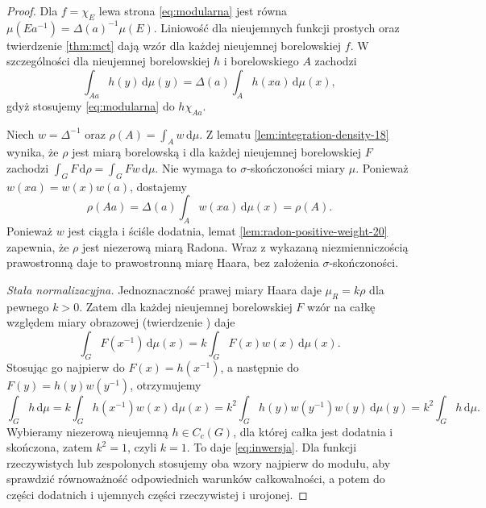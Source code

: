 \begin{proof}
Dla $f=\chi_E$ lewa strona \eqref{eq:modularna}
jest równa $\mu(Ea^{-1})=\Delta(a)^{-1}\mu(E)$.
Liniowość dla nieujemnych funkcji prostych oraz
twierdzenie \ref{thm:mct} dają wzór dla każdej
nieujemnej borelowskiej $f$.
W szczególności dla nieujemnej borelowskiej $h$
i borelowskiego $A$ zachodzi
\[
 \int_{Aa} h(y)\,\mathrm d\mu(y)
 =\Delta(a)\int_A h(xa)\,\mathrm d\mu(x),
\]
gdyż stosujemy \eqref{eq:modularna} do $h\chi_{Aa}$.

Niech $w=\Delta^{-1}$ oraz
$\rho(A)=\int_A w\,\mathrm d\mu$.
Z lematu \ref{lem:integration-density-18} wynika, że
$\rho$ jest miarą borelowską i dla każdej nieujemnej
borelowskiej $F$ zachodzi
$\int_G F\,\mathrm d\rho=\int_G Fw\,\mathrm d\mu$.
Nie wymaga to $\sigma$-skończoności miary $\mu$.
Ponieważ $w(xa)=w(x)w(a)$, dostajemy
\[
 \rho(Aa)=\Delta(a)\int_A w(xa)\,\mathrm d\mu(x)
 =\rho(A).
\]
Ponieważ $w$ jest ciągła i ściśle dodatnia, lemat
\ref{lem:radon-positive-weight-20} zapewnia, że
$\rho$ jest niezerową miarą Radona.
Wraz z wykazaną niezmienniczością prawostronną
daje to prawostronną miarę Haara, bez założenia
$\sigma$-skończoności.

\emph{Stała normalizacyjna.}
Jednoznaczność prawej miary Haara daje
$\mu_R=k\rho$ dla pewnego $k>0$. Zatem dla każdej
nieujemnej borelowskiej $F$ wzór na całkę względem
miary obrazowej (twierdzenie
) daje
\[
 \int_G F(x^{-1})\,\mathrm d\mu(x)
 = k\int_G F(x)w(x)\,\mathrm d\mu(x).
\]
Stosując go najpierw do $F(x)=h(x^{-1})$,
a następnie do $F(y)=h(y)w(y^{-1})$, otrzymujemy
\[
 \int_G h\,\mathrm d\mu
 =k\int_G h(x^{-1})w(x)\,\mathrm d\mu(x)
 =k^2\int_G h(y)w(y^{-1})w(y)\,\mathrm d\mu(y)
 =k^2\int_G h\,\mathrm d\mu .
\]
Wybieramy niezerową nieujemną $h\in C_c(G)$,
dla której całka jest dodatnia i skończona,
zatem $k^2=1$, czyli $k=1$.
To daje \eqref{eq:inwersja}. Dla funkcji rzeczywistych
lub zespolonych stosujemy oba wzory najpierw do
modułu, aby sprawdzić równoważność odpowiednich
warunków całkowalności, a potem do części
dodatnich i ujemnych części rzeczywistej i urojonej.
\end{proof}

